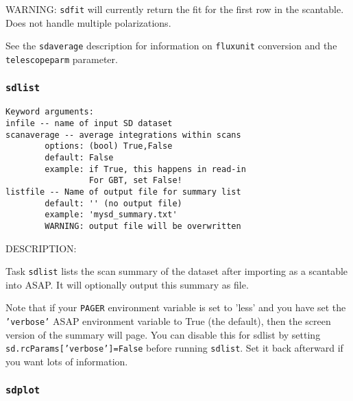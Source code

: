     WARNING: {\tt sdfit} will currently return the fit for the first
    row in the scantable.  Does not handle multiple polarizations.

    See the {\tt sdaverage} description for information on {\tt fluxunit} 
    conversion and the {\tt telescopeparm} parameter.


\subsubsection{{\tt sdlist}}
\label{section:sd.sdtasks.tasks.sdlist}

\begin{verbatim}
Keyword arguments:
infile -- name of input SD dataset
scanaverage -- average integrations within scans
        options: (bool) True,False
        default: False
        example: if True, this happens in read-in
                 For GBT, set False!
listfile -- Name of output file for summary list
        default: '' (no output file)
        example: 'mysd_summary.txt'
        WARNING: output file will be overwritten
\end{verbatim}
    
    DESCRIPTION:
    
    Task {\tt sdlist} lists the scan summary of the dataset after importing
    as a scantable into ASAP.  It will optionally output this summary
    as file.
    
    Note that if your {\tt PAGER} environment variable is set to 'less' and
    you have set the {\tt 'verbose'} ASAP environment variable to True
    (the default), then the screen version of the summary will page.
    You can disable this for sdlist by setting
         {\tt sd.rcParams['verbose']=False}
    before running {\tt sdlist}.  Set it back afterward if you want lots
    of information.

\subsubsection{{\tt sdplot}}
\label{section:sd.sdtasks.tasks.sdplot}

